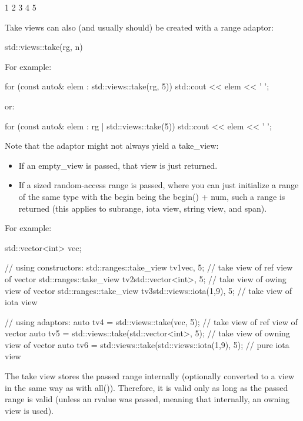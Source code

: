 \begin{shell}
1 2 3 4 5
\end{shell}


Take views can also (and usually should) be created with a range adaptor:

\begin{cpp}
std::views::take(rg, n)
\end{cpp}

For example:

\begin{cpp}
for (const auto& elem : std::views::take(rg, 5)) {
	std::cout << elem << ' ';
}
\end{cpp}

or:

\begin{cpp}
for (const auto& elem : rg | std::views::take(5)) {
	std::cout << elem << ' ';
}
\end{cpp}

Note that the adaptor might not always yield a take\_view:

\begin{itemize}
\item
If an empty\_view is passed, that view is just returned.

\item
If a sized random-access range is passed, where you can just initialize a range of the same type with the begin being the begin() + num, such a range is returned (this applies to subrange, iota view, string view, and span).
\end{itemize}

For example:

\begin{cpp}
std::vector<int> vec;

// using constructors:
std::ranges::take_view tv1{vec, 5}; // take view of ref view of vector
std::ranges::take_view tv2{std::vector<int>{}, 5}; // take view of owing view of vector
std::ranges::take_view tv3{std::views::iota(1,9), 5}; // take view of iota view

// using adaptors:
auto tv4 = std::views::take(vec, 5); // take view of ref view of vector
auto tv5 = std::views::take(std::vector<int>{}, 5); // take view of owning view of vector
auto tv6 = std::views::take(std::views::iota(1,9), 5); // pure iota view
\end{cpp}

The take view stores the passed range internally (optionally converted to a view in the same way as with all()). Therefore, it is valid only as long as the passed range is valid (unless an rvalue was passed, meaning that internally, an owning view is used).

